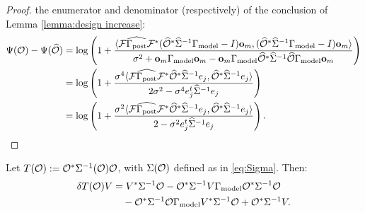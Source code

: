 \documentclass{amsart}
\numberwithin{equation}{section}
\providecommand{\DIFaddend}{} %
\begin{document}
\begin{proof}
  the enumerator and denominator (respectively) of the conclusion of
  Lemma \ref{lemma:design increase}:
  \begin{align*}
    \Psi( \mathcal{O} ) - \Psi (\widehat{\mathcal{O}} ) &=
    \log \left ( 1 + \frac{
      \langle \mathcal{F} \widehat{\Gamma_{\textup{post}}} \mathcal{F}^* (\widehat{\mathcal{O}}^* \widehat{\Sigma}^{-1} \Gamma_{\textup{model}} - I ) \mathbf{o}_m,
      (\widehat{\mathcal{O}}^* \widehat{\Sigma}^{-1} \Gamma_{\textup{model}} - I ) \mathbf{o}_m \rangle
    }{
      \sigma^2 + \mathbf{o}_m \Gamma_{\textup{model}} \mathbf{o}_m - \mathbf{o}_m \Gamma_{\textup{model}} \widehat{\mathcal{O}}^* \widehat{\Sigma}^{-1} \widehat{\mathcal{O}} \Gamma_{\textup{model}} \mathbf{o}_m 
    }       
    \right ) \\
    &= \log \left ( 1 + \frac{\sigma^4
      \langle \mathcal{F} \widehat{\Gamma_{\textup{post}}} \mathcal{F}^* \widehat{\mathcal{O}}^* \widehat{\Sigma}^{-1} e_j,
      \widehat{\mathcal{O}}^* \widehat{\Sigma}^{-1}e_j \rangle
    }{
      2\sigma^2 - \sigma^4 e_j^t\widehat{\Sigma}^{-1}e_j 
    }       
    \right ) \\
    &= \log \left ( 1 + \frac{\sigma^2
      \langle \mathcal{F} \widehat{\Gamma_{\textup{post}}} \mathcal{F}^* \widehat{\mathcal{O}}^* \widehat{\Sigma}^{-1} e_j,
      \widehat{\mathcal{O}}^* \widehat{\Sigma}^{-1}e_j \rangle
    }{
      2 - \sigma^2 e_j^t\widehat{\Sigma}^{-1}e_j 
    }       
    \right ).
  \end{align*}
\end{proof}
\DIFaddend 


\begin{lemma}\label{lemma:aux calc}
  Let $T(\mathcal{O}) := \mathcal{O}^* \Sigma^{-1}(\mathcal{O})\mathcal{O}$, with $\Sigma(\mathcal{O})$
  defined as in \eqref{eq:Sigma}. Then:
  \begin{align*}
    \delta T(\mathcal{O})V &= V^* \Sigma^{-1} \mathcal{O} 
    - \mathcal{O}^*\Sigma^{-1} V\Gamma_{\textup{model}} \mathcal{O}^* \Sigma^{-1}\mathcal{O} \\
    &\ \ \ - \mathcal{O}^* \Sigma^{-1} \mathcal{O} \Gamma_{\textup{model}} V^* \Sigma^{-1}\mathcal{O}
    + \mathcal{O}^* \Sigma^{-1} V.
  \end{align*}
\end{lemma}
\end{document}
